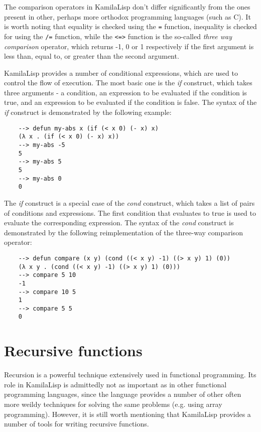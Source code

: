 The comparison operators in KamilaLisp don't differ significantly from the ones present in other, perhaps more orthodox programming languages (such as C). It is worth noting that equality is checked using the \verb|=| function, inequality is checked for using the \verb|/=| function, while the \verb|<=>| function is the so-called \textit{three way comparison} operator, which returns -1, 0 or 1 respectively if the first argument is less than, equal to, or greater than the second argument.

KamilaLisp provides a number of conditional expressions, which are used to control the flow of execution. The most basic one is the \textit{if} construct, which takes three arguments - a condition, an expression to be evaluated if the condition is true, and an expression to be evaluated if the condition is false. The syntax of the \textit{if} construct is demonstrated by the following example:

\begin{Verbatim}
    --> defun my-abs x (if (< x 0) (- x) x)
    (λ x . (if (< x 0) (- x) x))
    --> my-abs -5
    5
    --> my-abs 5
    5
    --> my-abs 0
    0
\end{Verbatim}

The \textit{if} construct is a special case of the \textit{cond} construct, which takes a list of pairs of conditions and expressions. The first condition that evaluates to true is used to evaluate the corresponding expression. The syntax of the \textit{cond} construct is demonstrated by the following reimplementation of the three-way comparison operator:

\begin{Verbatim}
    --> defun compare (x y) (cond ((< x y) -1) ((> x y) 1) (0))
    (λ x y . (cond ((< x y) -1) ((> x y) 1) (0)))
    --> compare 5 10
    -1
    --> compare 10 5
    1
    --> compare 5 5
    0
\end{Verbatim}

\section{Recursive functions}

Recursion is a powerful technique extensively used in functional programming. Its role in KamilaLisp is admittedly not as important as in other functional programming languages, since the language provides a number of other often more weildy techniques for solving the same problems (e.g. using array programming). However, it is still worth mentioning that KamilaLisp provides a number of tools for writing recursive functions.

